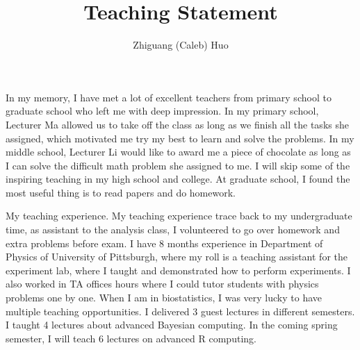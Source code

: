 \documentclass[12pt]{amsart} \usepackage{amssymb}
\title[]{Teaching Statement}
\author[]{Zhiguang (Caleb) Huo}
\begin{document}
\maketitle
\thispagestyle{empty}

In my memory,
I have met a lot of excellent teachers from primary school to graduate school who left me with deep impression.
In my primary school, 
Lecturer Ma allowed us to take off the class as long as we finish all the tasks she assigned, 
which motivated me try my best to learn and solve the problems.
In my middle school, 
Lecturer Li would like to award me a piece of chocolate as long as I can solve the difficult math problem she assigned to me.
I will skip some of the inspiring teaching in my high school and college.
At graduate school, I found the most useful thing is to read papers and do homework.

My teaching experience.
My teaching experience trace back to my undergraduate time,
as assistant to the analysis class, I volunteered to go over homework and extra problems before exam.
I have 8 months experience in Department of Physics of University of Pittsburgh,
where my roll is a teaching assistant for the experiment lab, where I taught and demonstrated how to perform experiments.
I also worked in TA offices hours where I could tutor students with physics problems one by one.
When I am in biostatistics, I was very lucky to have multiple teaching opportunities.
I delivered 3 guest lectures in different semesters.
I taught 4 lectures about advanced Bayesian computing.
In the coming spring semester, I will teach 6 lectures on advanced R computing.
\end{document}
